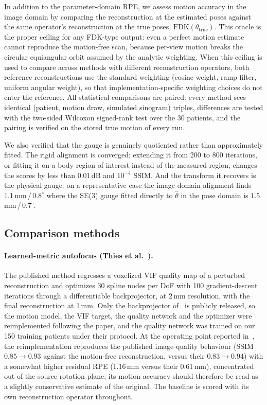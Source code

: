 \documentclass[11pt]{article}
\newcommand{\FDK}{\mathrm{FDK}}
\newcommand{\thetahat}{\hat\theta}
\begin{document}
In addition to the parameter-domain RPE, we assess motion accuracy in the image domain by
comparing the reconstruction at the estimated poses against the same operator's
reconstruction at the true poses, $\FDK(\theta_{\mathrm{true}})$. This oracle is the proper
ceiling for any FDK-type output: even a perfect motion estimate cannot reproduce the
motion-free scan, because per-view motion breaks the circular equiangular orbit assumed by
the analytic weighting. When this ceiling is used to compare across methods with different
reconstruction operators, both reference reconstructions use the standard weighting (cosine
weight, ramp filter, uniform angular weight), so that implementation-specific weighting
choices do not enter the reference. All statistical comparisons are paired: every method sees
identical (patient, motion draw, simulated sinogram) triples, differences are tested with the
two-sided Wilcoxon signed-rank test over the 30 patients, and the pairing is verified on the
stored true motion of every run.

We also verified that the gauge is genuinely quotiented rather than approximately fitted.
The rigid alignment is converged: extending it from 200 to 800 iterations, or fitting it on
a body region of interest instead of the measured region, changes the scores by less than
0.01\,dB and $10^{-4}$ SSIM. And the transform it recovers is the physical gauge: on a
representative case the image-domain alignment finds 1.1\,mm\,/\,$0.8^\circ$ where the SE(3)
gauge fitted directly to $\thetahat$ in the pose domain is 1.5\,mm\,/\,$0.7^\circ$.

\subsection{Comparison methods}
\label{sec:baselines}

\paragraph{Learned-metric autofocus (Thies et al.~\cite{thies25}).}
The published method regresses a voxelized VIF quality map of a perturbed reconstruction and
optimizes 30 spline nodes per DoF with 100 gradient-descent iterations through a
differentiable backprojector, at 2\,mm resolution, with the final reconstruction at 1\,mm.
Only the backprojector of~\cite{thies25} is publicly released, so the motion model, the
VIF target, the quality network and the optimizer were reimplemented following the paper,
and the quality network was trained on our 150 training patients under their protocol. At the
operating point reported in~\cite{thies25}, the reimplementation reproduces the published
image-quality behaviour (SSIM $0.85\to0.93$ against the motion-free reconstruction, versus
their $0.83\to0.94$) with a somewhat higher residual RPE (1.16\,mm versus their 0.61\,mm),
concentrated out of the source rotation plane; its motion accuracy should therefore be read
as a slightly conservative estimate of the original. The baseline is scored with its own
reconstruction operator throughout.
\end{document}
